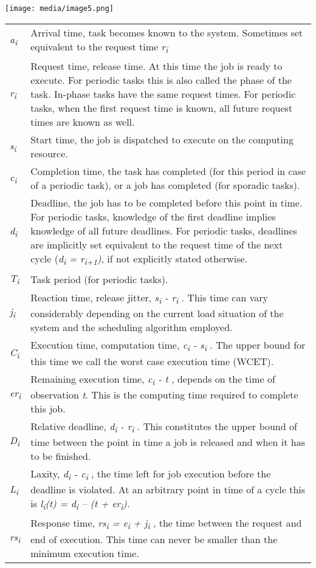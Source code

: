 \texttt{[image: media/image5.png]}

\begin{longtable}[c]{@{}ll@{}}
\toprule
\emph{a\textsubscript{i}} & Arrival time, task becomes known to the
system. Sometimes set equivalent to the request time
\emph{r\textsubscript{i}}\tabularnewline
\emph{r\textsubscript{i}} & Request time, release time. At this time the
job is ready to execute. For periodic tasks this is also called the
phase of the task. In-phase tasks have the same request times. For
periodic tasks, when the first request time is known, all future request
times are known as well.\tabularnewline
\emph{s\textsubscript{i}} & Start time, the job is dispatched to execute
on the computing resource.\tabularnewline
\emph{c\textsubscript{i}} & Completion time, the task has completed (for
this period in case of a periodic task), or a job has completed (for
sporadic tasks).\tabularnewline
\emph{d\textsubscript{i}} & Deadline, the job has to be completed before
this point in time. For periodic tasks, knowledge of the first deadline
implies knowledge of all future deadlines. For periodic tasks, deadlines
are implicitly set equivalent to the request time of the next cycle
(\emph{d\textsubscript{i} = r\textsubscript{i+1})}, if not explicitly
stated otherwise.\tabularnewline
\emph{T\textsubscript{i}} & Task period (for periodic
tasks).\tabularnewline
\emph{j\textsubscript{i}} & Reaction time, release jitter,
\emph{s\textsubscript{i} - r\textsubscript{i}} . This time can vary
considerably depending on the current load situation of the system and
the scheduling algorithm employed.\tabularnewline
\emph{C\textsubscript{i}} & Execution time, computation time,
\emph{c\textsubscript{i} - s\textsubscript{i}} . The upper bound for
this time we call the worst case execution time (WCET).\tabularnewline
\emph{er\textsubscript{i}} & Remaining execution time,
\emph{c\textsubscript{i} - t} , depends on the time of observation
\emph{t}. This is the computing time required to complete this
job.\tabularnewline
\emph{D\textsubscript{i}} & Relative deadline, \emph{d\textsubscript{i}
- r\textsubscript{i}} . This constitutes the upper bound of time between
the point in time a job is released and when it has to be
finished.\tabularnewline
\emph{L\textsubscript{i}} & Laxity, \emph{d\textsubscript{i} -
c\textsubscript{i}} , the time left for job execution before the
deadline is violated. At an arbitrary point in time of a cycle this is
\emph{l\textsubscript{i}(t) = d\textsubscript{i} -- (t +
er\textsubscript{i}).}\tabularnewline
\emph{rs\textsubscript{i}} & Response time, \emph{rs\textsubscript{i} =
e\textsubscript{i} + j\textsubscript{i}} , the time between the request
and end of execution. This time can never be smaller than the minimum
execution time.\tabularnewline
\bottomrule
\end{longtable}

